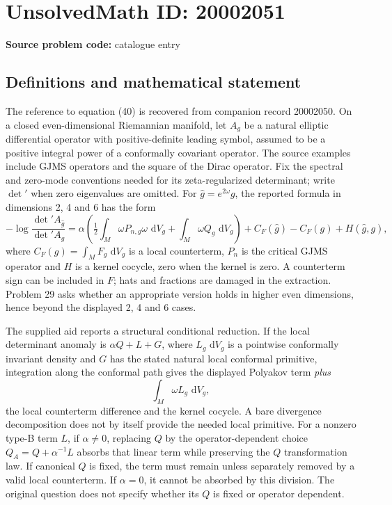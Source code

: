 \documentclass[11pt]{article}
\newcommand{\dd}{\,\mathrm{d}}
\begin{document}
\section*{UnsolvedMath ID: 20002051}
\textbf{Source problem code:} catalogue entry
\subsection{Definitions and mathematical statement}
The reference to equation (40) is recovered from companion record 20002050. On a closed even-dimensional Riemannian manifold, let \(A_g\) be a natural elliptic differential operator with positive-definite leading symbol, assumed to be a positive integral power of a conformally covariant operator. The source examples include GJMS operators and the square of the Dirac operator. Fix the spectral and zero-mode conventions needed for its zeta-regularized determinant; write \(\det'\) when zero eigenvalues are omitted. For \(\widehat g=e^{2\omega}g\), the reported formula in dimensions 2, 4 and 6 has the form
\[
-\log\frac{\det' A_{\widehat g}}{\det' A_g}
=\alpha\left(\tfrac12\int_M\omega P_{n,g}\omega\,\dd V_g
+\int_M\omega Q_g\,\dd V_g\right)
+C_F(\widehat g)-C_F(g)+H(\widehat g,g),
\]
where \(C_F(g)=\int_MF_g\,\dd V_g\) is a local counterterm, \(P_n\) is the critical GJMS operator and \(H\) is a kernel cocycle, zero when the kernel is zero. A counterterm sign can be included in \(F\); hats and fractions are damaged in the extraction. Problem 29 asks whether an appropriate version holds in higher even dimensions, hence beyond the displayed 2, 4 and 6 cases.

The supplied aid reports a structural conditional reduction. If the local determinant anomaly is \(\alpha Q+L+G\), where \(L_g\,\dd V_g\) is a pointwise conformally invariant density and \(G\) has the stated natural local conformal primitive, integration along the conformal path gives the displayed Polyakov term \emph{plus}
\[
\int_M\omega L_g\,\dd V_g,
\]
the local counterterm difference and the kernel cocycle. A bare divergence decomposition does not by itself provide the needed local primitive. For a nonzero type-B term \(L\), if \(\alpha\ne0\), replacing \(Q\) by the operator-dependent choice \(Q_A=Q+\alpha^{-1}L\) absorbs that linear term while preserving the \(Q\) transformation law. If canonical \(Q\) is fixed, the term must remain unless separately removed by a valid local counterterm. If \(\alpha=0\), it cannot be absorbed by this division. The original question does not specify whether its \(Q\) is fixed or operator dependent.
\end{document}
